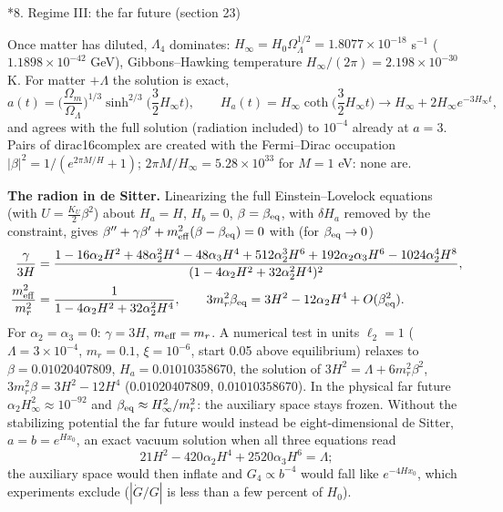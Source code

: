 \documentclass[10pt,a4paper]{article}
\makeatletter
\renewcommand\section{\@startsection{section}{1}{\z@}{-3.5ex \@plus -1ex \@minus -.2ex}{2.3ex \@plus.2ex}{\normalfont\Large\bfseries\raggedright}}
\makeatother
\begin{document}
\section*{8. Regime III: the far future (section 23)}
Once matter has diluted, $\Lambda_4$ dominates: $H_\infty=H_0\Omega_\Lambda^{1/2}=1.8077\times10^{-18}$ s$^{-1}$ ($1.1898\times10^{-42}$ GeV), Gibbons–Hawking temperature $H_\infty/(2\pi)=2.198\times10^{-30}$ K. For matter $+\Lambda$ the solution is exact,
\begin{equation*}
a(t)=\Big(\frac{\Omega_m}{\Omega_\Lambda}\Big)^{1/3}\sinh^{2/3}\Big(\frac32H_\infty t\Big),\qquad H_a(t)=H_\infty\coth\Big(\frac32H_\infty t\Big)\to H_\infty+2H_\infty e^{-3H_\infty t},
\end{equation*}
and agrees with the full solution (radiation included) to $10^{-4}$ already at $a=3$. Pairs of dirac16complex are created with the Fermi–Dirac occupation $|\beta|^2=1/(e^{2\pi M/H}+1)$; $2\pi M/H_\infty=5.28\times10^{33}$ for $M=1$ eV: none are.

\textbf{The radion in de Sitter.} Linearizing the full Einstein–Lovelock equations (with $U=\tfrac{K_U}2\beta^2$) about $H_a=H$, $H_b=0$, $\beta=\beta_{\rm eq}$, with $\delta H_a$ removed by the constraint, gives $\beta''+\gamma\beta'+m_{\rm eff}^2(\beta-\beta_{\rm eq})=0$ with (for $\beta_{\rm eq}\to0$)
\begin{align*}
\frac{\gamma}{3H}&=\frac{1-16\alpha_2H^2+48\alpha_2^2H^4-48\alpha_3H^4+512\alpha_2^3H^6+192\alpha_2\alpha_3H^6-1024\alpha_2^4H^8}{(1-4\alpha_2H^2+32\alpha_2^2H^4)^2}, \\
\frac{m_{\rm eff}^2}{m_r^2}&=\frac1{1-4\alpha_2H^2+32\alpha_2^2H^4},\qquad 3m_r^2\beta_{\rm eq}=3H^2-12\alpha_2H^4+O(\beta_{\rm eq}^2).
\end{align*}
For $\alpha_2=\alpha_3=0$: $\gamma=3H$, $m_{\rm eff}=m_r$. A numerical test in units $\ell_2=1$ ($\Lambda=3\times10^{-4}$, $m_r=0.1$, $\xi=10^{-6}$, start 0.05 above equilibrium) relaxes to $\beta=0.01020407809$, $H_a=0.01010358670$, the solution of $3H^2=\Lambda+6m_r^2\beta^2$, $3m_r^2\beta=3H^2-12H^4$ ($0.01020407809$, $0.01010358670$). In the physical far future $\alpha_2H_\infty^2\approx10^{-92}$ and $\beta_{\rm eq}\approx H_\infty^2/m_r^2$: the auxiliary space stays frozen. Without the stabilizing potential the far future would instead be eight-dimensional de Sitter, $a=b=e^{Hx_0}$, an exact vacuum solution when all three equations read
\begin{equation*}
21H^2-420\alpha_2H^4+2520\alpha_3H^6=\Lambda ;
\end{equation*}
the auxiliary space would then inflate and $G_4\propto b^{-4}$ would fall like $e^{-4Hx_0}$, which experiments exclude ($|\dot G/G|$ is less than a few percent of $H_0$).
\end{document}
